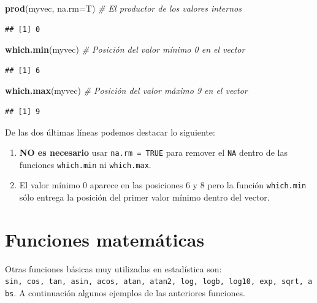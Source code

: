 \documentclass[10pt,]{krantz}
\makeatletter
\newenvironment{Shaded}{\begin{snugshade}}{\end{snugshade}}
\newcommand{\KeywordTok}[1]{\textcolor[rgb]{0.13,0.29,0.53}{\textbf{{#1}}}}
\newcommand{\DataTypeTok}[1]{\textcolor[rgb]{0.13,0.29,0.53}{{#1}}}
\newcommand{\CommentTok}[1]{\textcolor[rgb]{0.56,0.35,0.01}{\textit{{#1}}}}
\newcommand{\NormalTok}[1]{{#1}}
\providecommand{\tightlist}{%
  \setlength{\itemsep}{0pt}\setlength{\parskip}{0pt}}
\newenvironment{kframe}{%
\medskip{}
\setlength{\fboxsep}{.8em}
 \def\at@end@of@kframe{}%
 \ifinner\ifhmode%
  \def\at@end@of@kframe{\end{minipage}}%
  \begin{minipage}{\columnwidth}%
 \fi\fi%
 \def\FrameCommand##1{\hskip\@totalleftmargin \hskip-\fboxsep
 \colorbox{shadecolor}{##1}\hskip-\fboxsep
     \hskip-\linewidth \hskip-\@totalleftmargin \hskip\columnwidth}%
 \MakeFramed {\advance\hsize-\width
   \@totalleftmargin\z@ \linewidth\hsize
   \@setminipage}}%
 {\par\unskip\endMakeFramed%
 \at@end@of@kframe}
\renewenvironment{Shaded}{\begin{kframe}}{\end{kframe}}
\makeatother
\begin{document}
\begin{Shaded}
\begin{Highlighting}[]
\KeywordTok{prod}\NormalTok{(myvec, }\DataTypeTok{na.rm=}\NormalTok{T)  }\CommentTok{# El productor de los valores internos}
\end{Highlighting}
\end{Shaded}

\begin{verbatim}
## [1] 0
\end{verbatim}

\begin{Shaded}
\begin{Highlighting}[]
\KeywordTok{which.min}\NormalTok{(myvec)  }\CommentTok{# Posición del valor mínimo 0 en el vector}
\end{Highlighting}
\end{Shaded}

\begin{verbatim}
## [1] 6
\end{verbatim}

\begin{Shaded}
\begin{Highlighting}[]
\KeywordTok{which.max}\NormalTok{(myvec)  }\CommentTok{# Posición del valor máximo 9 en el vector}
\end{Highlighting}
\end{Shaded}

\begin{verbatim}
## [1] 9
\end{verbatim}

De las dos últimas líneas podemos destacar lo siguiente:

\begin{enumerate}
\def\labelenumi{\arabic{enumi}.}
\tightlist
\item
  \textbf{NO es necesario} usar \texttt{na.rm\ =\ TRUE} para remover el
  \texttt{NA} dentro de las funciones \texttt{which.min} ni
  \texttt{which.max}.
\item
  El valor mínimo 0 aparece en las posiciones 6 y 8 pero la función
  \texttt{which.min} sólo entrega la posición del primer valor mínimo
  dentro del vector.
\end{enumerate}

\section{Funciones matemáticas}\label{funciones-matematicas}

Otras funciones básicas muy utilizadas en estadística son:
\texttt{sin,\ cos,\ tan,\ asin,\ acos,\ atan,\ atan2,\ log,\ logb,\ log10,\ exp,\ sqrt,\ abs}.
A continuación algunos ejemplos de las anteriores funciones.
\end{document}
